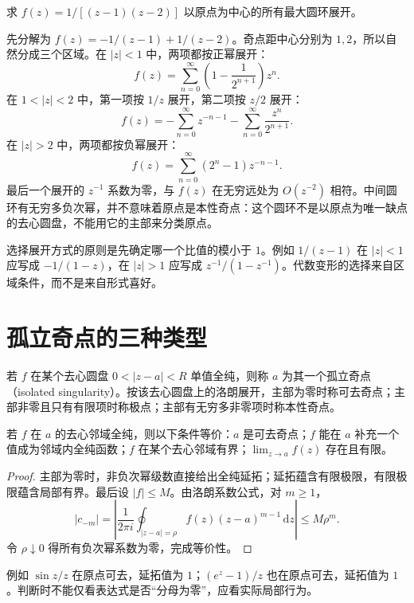 \documentclass[UTF8,12pt,a4paper,fontset=fandol]{ctexbook}
\begin{document}
\begin{example}[展开式必须附带适用区域]
\label{ex:cv-annuli}
求 $f(z)=1/[(z-1)(z-2)]$ 以原点为中心的所有最大圆环展开。
\end{example}
\begin{solve}
先分解为 $f(z)=-1/(z-1)+1/(z-2)$。奇点距中心分别为 $1,2$，所以自然分成三个区域。在 $|z|<1$ 中，两项都按正幂展开：
\[
 f(z)=\sum_{n=0}^\infty\left(1-\frac1{2^{n+1}}\right)z^n.
\]
在 $1<|z|<2$ 中，第一项按 $1/z$ 展开，第二项按 $z/2$ 展开：
\[
 f(z)=-\sum_{n=0}^\infty z^{-n-1}
 -\sum_{n=0}^\infty\frac{z^n}{2^{n+1}}.
\]
在 $|z|>2$ 中，两项都按负幂展开：
\[
 f(z)=\sum_{n=0}^\infty(2^n-1)z^{-n-1}.
\]
最后一个展开的 $z^{-1}$ 系数为零，与 $f(z)$ 在无穷远处为 $O(z^{-2})$ 相符。中间圆环有无穷多负次幂，并不意味着原点是本性奇点：这个圆环不是以原点为唯一缺点的去心圆盘，不能用它的主部来分类原点。
\end{solve}

选择展开方式的原则是先确定哪一个比值的模小于 $1$。例如 $1/(z-1)$ 在 $|z|<1$ 应写成 $-1/(1-z)$，在 $|z|>1$ 应写成 $z^{-1}/(1-z^{-1})$。代数变形的选择来自区域条件，而不是来自形式喜好。

\section{孤立奇点的三种类型}

\begin{definition}[孤立奇点]
若 $f$ 在某个去心圆盘 $0<|z-a|<R$ 单值全纯，则称 $a$ 为其一个孤立奇点（isolated singularity）。按该去心圆盘上的洛朗展开，主部为零时称可去奇点；主部非零且只有有限项时称极点；主部有无穷多非零项时称本性奇点。
\end{definition}

\begin{theorem}[可去奇点判别]
\label{thm:cv-removable}
若 $f$ 在 $a$ 的去心邻域全纯，则以下条件等价：$a$ 是可去奇点；$f$ 能在 $a$ 补充一个值成为邻域内全纯函数；$f$ 在某个去心邻域有界；$\lim_{z\to a}f(z)$ 存在且有限。
\end{theorem}
\begin{proof}
主部为零时，非负次幂级数直接给出全纯延拓；延拓蕴含有限极限，有限极限蕴含局部有界。最后设 $|f|\le M$。由洛朗系数公式，对 $m\ge1$，
\[
 |c_{-m}|=\left|\frac1{2\pi i}\oint_{|z-a|=\rho}f(z)(z-a)^{m-1}\,\mathrm dz\right|
 \le M\rho^m.
\]
令 $\rho\downarrow0$ 得所有负次幂系数为零，完成等价性。
\end{proof}

例如 $\sin z/z$ 在原点可去，延拓值为 $1$；$(e^z-1)/z$ 也在原点可去，延拓值为 $1$。判断时不能仅看表达式是否“分母为零”，应看实际局部行为。
\end{document}
